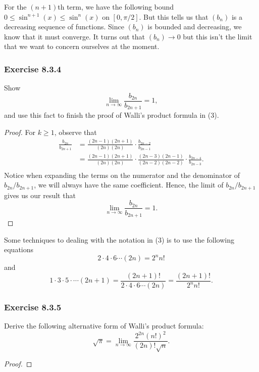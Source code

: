For the \( (n+1) \)th term, we have the following bound \(  0 \leq \sin^{n+1}(x) \leq \sin^{n}(x)  \) on \( [0, \pi / 2]  \). But this tells us that \( (b_{n})  \) is a decreasing sequence of functions.  Since \( (b_{n}) \) is bounded and decreasing, we know that it must converge. It turns out that \( (b_{n}) \to 0  \) but this isn't the limit that we want to concern ourselves at the moment. 

\subsubsection{Exercise 8.3.4} Show 
\[  \lim_{ n \to \infty  }  \frac{ b_{2n} }{  b_{2n+1} }  = 1,  \] and use this fact to finish the proof of Walli's product formula in (3).
\begin{proof}
For \( k \geq 1  \), observe that
\begin{align*}
  \frac{ b_{2n} }{  b_{2n+1} }   &= \frac{ (2n-1) (2n+1)  }{ (2n)(2n) } \cdot \frac{ b_{2n-2}  }{ b_{2n-1} }   \\
                                 &= \frac{ (2n-1) (2n+1)  }{ (2n)(2n)  } \cdot \frac{ (2n-3) (2n-1)  }{ (2n-2) (2n-2)  } \cdot \frac{ b_{2n-4}  }{ b_{2n-3} } . \\ 
\end{align*}
Notice when expanding the terms on the numerator and the denominator of \( b_{2n} / b_{2n+1} \), we will always have the same coefficient. Hence, the limit of \( b_{2n} / b_{2n+1} \) gives us our result that 
\[  \lim_{ n \to \infty  }  \frac{ b_{2n}  }{  b_{2n+1} } = 1. \]
\end{proof}

Some techniques to dealing with the notation in (3) is to use the following equations 
\[  2 \cdot 4 \cdot 6 \dotsb (2n) = 2^{n} n! \] and
\[  1 \cdot 3 \cdot 5 \cdot \dotsb (2n+1) = \frac{ (2n+1)! }{  2 \cdot 4 \cdot 6 \dotsb (2n)  } = \frac{ (2n+1)! }{ 2^{n} n! }. \]


\subsubsection{Exercise 8.3.5} Derive the following alternative form of Walli's product formula: 
\[  \sqrt{ \pi }  = \lim_{ n \to \infty    }  \frac{ 2^{2n} (n!)^2  }{ (2n)! \sqrt{ n }  }. \]
\begin{proof}




\end{proof}


